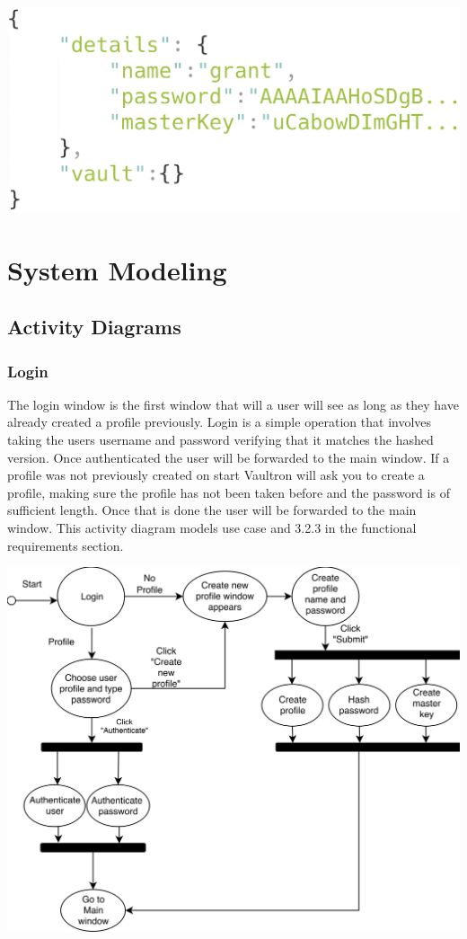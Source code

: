 \documentclass[11pt]{report}
\begin{document}
\vspace{4mm}
\includegraphics[scale=.35]{storage_format.png}

\chapter{System Modeling}

\section{Activity Diagrams}

\subsection{Login}
The login window is the first window that will a user will see as long as they have already created a profile previously. Login is a simple operation that involves taking the users username and password verifying that it matches the hashed version. Once authenticated the user will be forwarded to the main window. If a profile was not previously created on start Vaultron will ask you to create a profile, making sure the profile has not been taken before and the password is of sufficient length. Once that is done the user will be forwarded to the main window. This activity diagram models use case and 3.2.3 in the functional requirements section.

\vspace{4mm}
\includegraphics[scale=.076]{login_activity.png}
\end{document}

